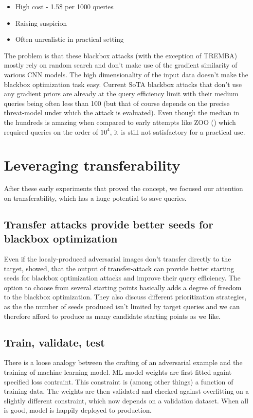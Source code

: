 \begin{itemize}
    \item{High cost - 1.5\$ per 1000 queries}
    \item{Raising suspicion}
    \item{Often unrealistic in practical setting}
\end{itemize}


The problem is that these blackbox attacks (with the exception of TREMBA) mostly rely on random search and don't make use of the gradient similarity of various CNN models. The high dimensionality of the input data doesn't make the blackbox optimization task easy. Current SoTA blackbox attacks that don't use any gradient priors are already at the query efficiency limit with their medium queries being often less than 100 (but that of course depends on the precise threat-model under which the attack is evaluated). Even though the median in the hundreds is amazing when compared to early attempts like ZOO (\cite{Chen2017ZOOZO}) which required queries on the order of $10^4$, it is still not satisfactory for a practical use. 


\section{Leveraging transferability}
\label{Leveraging_transferability}
After these early experiments that proved the concept, we focused our attention on transferability, which has a huge potential to save queries.

\subsection{Transfer attacks provide better seeds for blackbox optimization}
\label{transfer_attack_seeds}
Even if the localy-produced adversarial images don't transfer directly to the target, \cite{Suya2020HybridBA} showed, that the output of transfer-attack can provide better starting seeds for blackbox optimization attacks and improve their query efficiency. The option to choose from several starting points basically adds a degree of freedom to the blackbox optimization. They also discuss different prioritization strategies, as the the number of seeds produced isn't limited by target queries and we can therefore afford to produce as many candidate starting points as we like.

\subsection{Train, validate, test}
\label{ml_analogy}
There is a loose analogy between the crafting of an adversarial example and the training of machine learning model. ML model weights are first fitted againt specified loss contraint. This constraint is (among other things) a function of training data. The weights are then validated and checked against overfitting on a slightly different constraint, which now depends on a validation dataset. When all is good, model is happily deployed to production.

